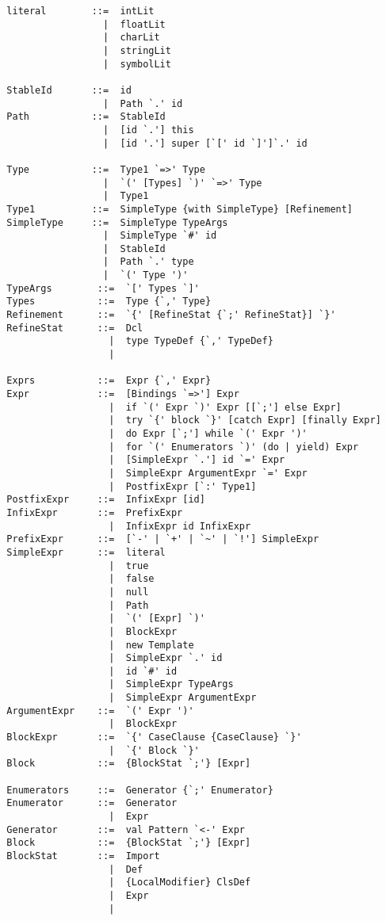 \documentclass[a4paper,12pt,twoside,titlepage]{book}
\begin{document}
\begin{lstlisting}
  literal        ::=  intLit
                   |  floatLit
                   |  charLit
                   |  stringLit
                   |  symbolLit

  StableId       ::=  id
                   |  Path `.' id
  Path           ::=  StableId
                   |  [id `.'] this
                   |  [id '.'] super [`[' id `]']`.' id

  Type           ::=  Type1 `=>' Type
                   |  `(' [Types] `)' `=>' Type
                   |  Type1
  Type1          ::=  SimpleType {with SimpleType} [Refinement]
  SimpleType     ::=  SimpleType TypeArgs
                   |  SimpleType `#' id
                   |  StableId
                   |  Path `.' type
                   |  `(' Type ')'
  TypeArgs        ::=  `[' Types `]'
  Types           ::=  Type {`,' Type}
  Refinement      ::=  `{' [RefineStat {`;' RefineStat}] `}'
  RefineStat      ::=  Dcl
                    |  type TypeDef {`,' TypeDef}
                    |

  Exprs           ::=  Expr {`,' Expr}
  Expr            ::=  [Bindings `=>'] Expr
                    |  if `(' Expr `)' Expr [[`;'] else Expr]
                    |  try `{' block `}' [catch Expr] [finally Expr]
                    |  do Expr [`;'] while `(' Expr ')'
                    |  for `(' Enumerators `)' (do | yield) Expr
                    |  [SimpleExpr `.'] id `=' Expr
                    |  SimpleExpr ArgumentExpr `=' Expr
                    |  PostfixExpr [`:' Type1]
  PostfixExpr     ::=  InfixExpr [id]
  InfixExpr       ::=  PrefixExpr
                    |  InfixExpr id InfixExpr
  PrefixExpr      ::=  [`-' | `+' | `~' | `!'] SimpleExpr 
  SimpleExpr      ::=  literal
                    |  true
                    |  false
                    |  null
                    |  Path
                    |  `(' [Expr] `)'
                    |  BlockExpr
                    |  new Template 
                    |  SimpleExpr `.' id 
                    |  id `#' id 
                    |  SimpleExpr TypeArgs
                    |  SimpleExpr ArgumentExpr
  ArgumentExpr    ::=  `(' Expr ')'
                    |  BlockExpr
  BlockExpr       ::=  `{' CaseClause {CaseClause} `}'
                    |  `{' Block `}'
  Block           ::=  {BlockStat `;'} [Expr]

  Enumerators     ::=  Generator {`;' Enumerator}
  Enumerator      ::=  Generator
                    |  Expr
  Generator       ::=  val Pattern `<-' Expr
  Block           ::=  {BlockStat `;'} [Expr]
  BlockStat       ::=  Import
                    |  Def
                    |  {LocalModifier} ClsDef
                    |  Expr
                    |


\end{lstlisting}
\end{document}
